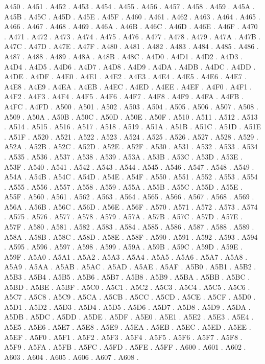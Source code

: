 A450 .
A451 .
A452 .
A453 .
A454 .
A455 .
A456 .
A457 .
A458 .
A459 .
A45A .
A45B .
A45C .
A45D .
A45E .
A45F .
A460 .
A461 .
A462 .
A463 .
A464 .
A465 .
A466 .
A467 .
A468 .
A469 .
A46A .
A46B .
A46C .
A46D .
A46E .
A46F .
A470 .
A471 .
A472 .
A473 .
A474 .
A475 .
A476 .
A477 .
A478 .
A479 .
A47A .
A47B .
A47C .
A47D .
A47E .
A47F .
A480 .
A481 .
A482 .
A483 .
A484 .
A485 .
A486 .
A487 .
A488 .
A489 .
A48A .
A48B .
A48C .
A4D0 .
A4D1 .
A4D2 .
A4D3 .
A4D4 .
A4D5 .
A4D6 .
A4D7 .
A4D8 .
A4D9 .
A4DA .
A4DB .
A4DC .
A4DD .
A4DE .
A4DF .
A4E0 .
A4E1 .
A4E2 .
A4E3 .
A4E4 .
A4E5 .
A4E6 .
A4E7 .
A4E8 .
A4E9 .
A4EA .
A4EB .
A4EC .
A4ED .
A4EE .
A4EF .
A4F0 .
A4F1 .
A4F2 .
A4F3 .
A4F4 .
A4F5 .
A4F6 .
A4F7 .
A4F8 .
A4F9 .
A4FA .
A4FB .
A4FC .
A4FD .
A500 .
A501 .
A502 .
A503 .
A504 .
A505 .
A506 .
A507 .
A508 .
A509 .
A50A .
A50B .
A50C .
A50D .
A50E .
A50F .
A510 .
A511 .
A512 .
A513 .
A514 .
A515 .
A516 .
A517 .
A518 .
A519 .
A51A .
A51B .
A51C .
A51D .
A51E .
A51F .
A520 .
A521 .
A522 .
A523 .
A524 .
A525 .
A526 .
A527 .
A528 .
A529 .
A52A .
A52B .
A52C .
A52D .
A52E .
A52F .
A530 .
A531 .
A532 .
A533 .
A534 .
A535 .
A536 .
A537 .
A538 .
A539 .
A53A .
A53B .
A53C .
A53D .
A53E .
A53F .
A540 .
A541 .
A542 .
A543 .
A544 .
A545 .
A546 .
A547 .
A548 .
A549 .
A54A .
A54B .
A54C .
A54D .
A54E .
A54F .
A550 .
A551 .
A552 .
A553 .
A554 .
A555 .
A556 .
A557 .
A558 .
A559 .
A55A .
A55B .
A55C .
A55D .
A55E .
A55F .
A560 .
A561 .
A562 .
A563 .
A564 .
A565 .
A566 .
A567 .
A568 .
A569 .
A56A .
A56B .
A56C .
A56D .
A56E .
A56F .
A570 .
A571 .
A572 .
A573 .
A574 .
A575 .
A576 .
A577 .
A578 .
A579 .
A57A .
A57B .
A57C .
A57D .
A57E .
A57F .
A580 .
A581 .
A582 .
A583 .
A584 .
A585 .
A586 .
A587 .
A588 .
A589 .
A58A .
A58B .
A58C .
A58D .
A58E .
A58F .
A590 .
A591 .
A592 .
A593 .
A594 .
A595 .
A596 .
A597 .
A598 .
A599 .
A59A .
A59B .
A59C .
A59D .
A59E .
A59F .
A5A0 .
A5A1 .
A5A2 .
A5A3 .
A5A4 .
A5A5 .
A5A6 .
A5A7 .
A5A8 .
A5A9 .
A5AA .
A5AB .
A5AC .
A5AD .
A5AE .
A5AF .
A5B0 .
A5B1 .
A5B2 .
A5B3 .
A5B4 .
A5B5 .
A5B6 .
A5B7 .
A5B8 .
A5B9 .
A5BA .
A5BB .
A5BC .
A5BD .
A5BE .
A5BF .
A5C0 .
A5C1 .
A5C2 .
A5C3 .
A5C4 .
A5C5 .
A5C6 .
A5C7 .
A5C8 .
A5C9 .
A5CA .
A5CB .
A5CC .
A5CD .
A5CE .
A5CF .
A5D0 .
A5D1 .
A5D2 .
A5D3 .
A5D4 .
A5D5 .
A5D6 .
A5D7 .
A5D8 .
A5D9 .
A5DA .
A5DB .
A5DC .
A5DD .
A5DE .
A5DF .
A5E0 .
A5E1 .
A5E2 .
A5E3 .
A5E4 .
A5E5 .
A5E6 .
A5E7 .
A5E8 .
A5E9 .
A5EA .
A5EB .
A5EC .
A5ED .
A5EE .
A5EF .
A5F0 .
A5F1 .
A5F2 .
A5F3 .
A5F4 .
A5F5 .
A5F6 .
A5F7 .
A5F8 .
A5F9 .
A5FA .
A5FB .
A5FC .
A5FD .
A5FE .
A5FF .
A600 .
A601 .
A602 .
A603 .
A604 .
A605 .
A606 .
A607 .
A608 .
